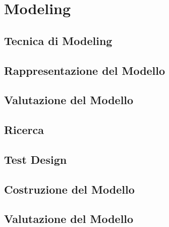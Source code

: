 \chapter{Modeling}

\section{Tecnica di Modeling}

\section{Rappresentazione del Modello}

\section{Valutazione del Modello}

\section{Ricerca}

\section{Test Design}

\section{Costruzione del Modello}

\section{Valutazione del Modello}

